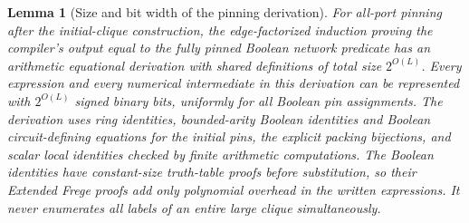 \documentclass[11pt]{article}
\newtheorem{lemma}[theorem]{Lemma}
\theoremstyle{definition}
\theoremstyle{remark}
\begin{document}
\begin{lemma}[Size and bit width of the pinning derivation]
\label{lem:rankone-derivation-size}
For all-port pinning after the initial-clique construction, the
edge-factorized induction proving the compiler's output equal to
the fully pinned Boolean network predicate has an arithmetic
equational derivation with shared definitions of total size
$2^{O(L)}$. Every expression and every numerical intermediate
in this derivation can be represented with $2^{O(L)}$ signed
binary bits, uniformly for all Boolean pin assignments. The
derivation uses ring identities, bounded-arity Boolean identities
and Boolean circuit-defining equations for the initial pins, the
explicit packing bijections, and scalar local identities checked
by finite arithmetic computations. The Boolean identities have
constant-size truth-table proofs before substitution, so their
Extended Frege proofs add only polynomial overhead in the written
expressions. It never enumerates all labels of an entire large
clique simultaneously.
\end{lemma}
\end{document}

